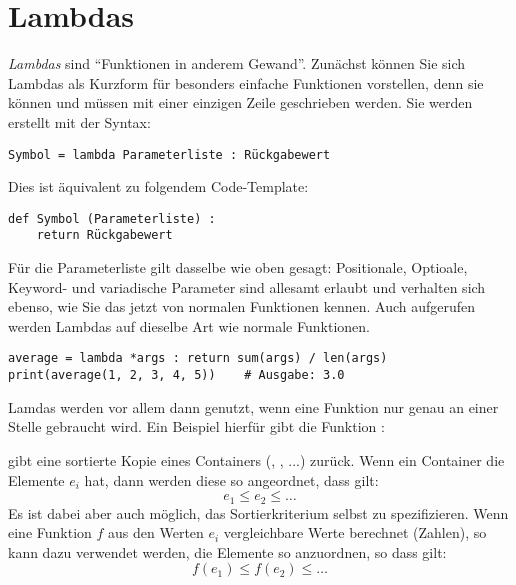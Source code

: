 \section{Lambdas}
\emph{Lambdas} sind \enquote{Funktionen in anderem Gewand}. Zunächst können Sie sich Lambdas als Kurzform für besonders einfache Funktionen vorstellen, denn sie können und müssen mit einer einzigen Zeile geschrieben werden. Sie werden erstellt mit der Syntax:

\begin{codebox}
\begin{verbatim}
Symbol = lambda Parameterliste : Rückgabewert
\end{verbatim}
\end{codebox}

Dies ist äquivalent zu folgendem Code-Template:
\begin{codebox}
\begin{verbatim}
def Symbol (Parameterliste) :
    return Rückgabewert
\end{verbatim}
\end{codebox}

Für die Parameterliste gilt dasselbe wie oben gesagt: Positionale, Optioale, Keyword- und variadische Parameter sind allesamt erlaubt und verhalten sich ebenso, wie Sie das jetzt von normalen Funktionen kennen. Auch aufgerufen werden Lambdas auf dieselbe Art wie normale Funktionen.

\begin{codebox}
\begin{verbatim}
average = lambda *args : return sum(args) / len(args)
print(average(1, 2, 3, 4, 5))    # Ausgabe: 3.0
\end{verbatim}
\end{codebox}

Lamdas werden vor allem dann genutzt, wenn eine Funktion nur genau an einer Stelle gebraucht wird. Ein Beispiel hierfür gibt die Funktion :

 gibt eine sortierte Kopie eines Containers (, , ...) zurück. Wenn ein Container die Elemente $e_i$ hat, dann werden diese so angeordnet, dass gilt:
\begin{equation*}
	e_1 \leq e_2 \leq \ldots
\end{equation*}
Es ist dabei aber auch möglich, das Sortierkriterium selbst zu spezifizieren. Wenn eine Funktion $f$ aus den Werten $e_i$ vergleichbare Werte berechnet (\eg Zahlen), so kann  dazu verwendet werden, die Elemente so anzuordnen, so dass gilt:
\begin{equation*}
	f(e_1) \leq f(e_2) \leq \ldots
\end{equation*}

